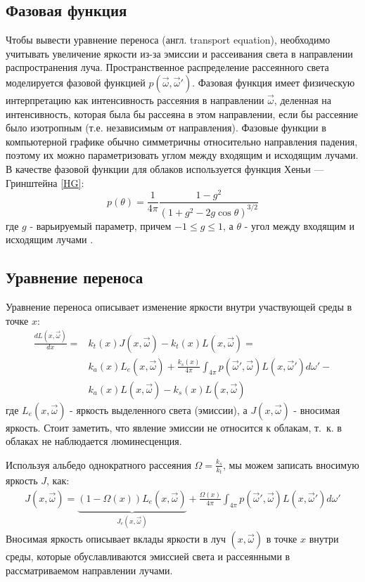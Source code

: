 \subsection{Фазовая функция}
Чтобы вывести уравнение переноса (англ. transport equation), необходимо учитывать увеличение яркости из-за эмиссии и рассеивания света в направлении распространения луча. Пространственное распределение рассеянного света моделируется фазовой функцией $ p(\vec{\omega}, \vec{\omega}') $. Фазовая функция имеет физическую интерпретацию как интенсивность рассеяния в направлении $\vec{\omega}$, деленная на интенсивность, которая была бы рассеяна в этом направлении, если бы рассеяние было изотропным (т.е. независимым от направления). Фазовые функции в компьютерной графике обычно симметричны относительно направления падения, поэтому их можно параметризовать углом между входящим и исходящим лучами. В качестве фазовой функции для облаков используется функция Хеньи — Гринштейна \eqref{HG}:
\begin{equation}
	\label{HG}
	p(\theta) = \frac{1}{4\pi} \frac{1 - g^2}{(1 + g^2 - 2g\cos \theta)^{3/2}}
\end{equation}
где $ g $ - варьируемый параметр, причем $ -1 \leq g \leq 1 $, а $\theta$ - угол между входящим и исходящим лучами \cite{clouds}.

\subsection{Уравнение переноса}
Уравнение переноса описывает изменение яркости внутри участвующей среды в точке $ x $:
\begin{equation}
	\label{rte}
	\begin{aligned}
		\frac{dL(x, \vec{\omega})}{dx} = & k_t(x) J(x, \vec{\omega}) - k_t(x) L(x, \vec{\omega})  = \\
		 & k_a(x) L_e(x, \vec{\omega}) + \frac{k_s(x)}{4\pi} \int_{4\pi} p(\vec{\omega}', \vec{\omega}) L(x, \vec{\omega}') d\omega' - \\
		& k_a(x) L(x, \vec{\omega}) - k_s(x) L(x, \vec{\omega})	
	\end{aligned}
\end{equation}
где $ L_e(x, \vec{\omega}) $ - яркость выделенного света (эмиссии), а $ J(x, \vec{\omega}) $ - вносимая яркость. Стоит заметить, что явление эмиссии не относится к облакам, т.~к. в облаках не наблюдается люминесценция.    
 
Используя альбедо однократного рассеяния $ \Omega = \frac{k_s}{k_t} $, мы можем записать вносимую яркость $J$, как:
\begin{equation}
	\label{sourcerad}
	\begin{aligned}
		J(x, \vec{\omega}) = \underbrace{(1 - \Omega(x)) L_e(x, \vec{\omega})}_{J_e(x, \vec{\omega})} + \frac{\Omega(x)}{4\pi} \int_{4\pi} p(\vec{\omega}', \vec{\omega}) L(x, \vec{\omega}') d\omega'
	\end{aligned}
\end{equation}
Вносимая яркость описывает вклады яркости в луч $ (x, \vec{\omega}) $ в точке $ x $ внутри среды, которые обуславливаются эмиссией света и рассеянными в рассматриваемом направлении лучами. 

